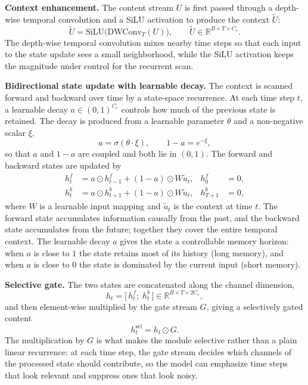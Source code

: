 \noindent\textbf{Context enhancement.}
The content stream $U$ is first passed through a depth-wise temporal
convolution and a SiLU activation to produce the context $\tilde{U}$:
\begin{equation}
  \tilde{U} = \mathrm{SiLU}\big(\mathrm{DWConv}_T(U)\big),
  \qquad \tilde{U} \in \mathbb{R}^{B \times T \times C_r}.
\end{equation}
The depth-wise temporal convolution mixes nearby time steps so that each input
to the state update sees a small neighborhood, while the SiLU activation
keeps the magnitude under control for the recurrent scan.

\noindent\textbf{Bidirectional state update with learnable decay.}
The context is scanned forward and backward over time by a state-space
recurrence. At each time step $t$, a learnable decay $a \in (0,1)^{C_r}$
controls how much of the previous state is retained. The decay is produced
from a learnable parameter $\theta$ and a non-negative scalar $\xi$,
\begin{equation}
  a = \sigma(\theta \cdot \xi), \qquad 1 - a = e^{-\xi},
\end{equation}
so that $a$ and $1-a$ are coupled and both lie in $(0,1)$. The forward and
backward states are updated by
\begin{align}
  h_t^f &= a \odot h_{t-1}^f + (1 - a) \odot W \tilde{u}_t,
          & h_0^f &= 0, \label{eq:tsa_fwd}\\
  h_t^b &= a \odot h_{t+1}^b + (1 - a) \odot W \tilde{u}_t,
          & h_{T+1}^b &= 0, \label{eq:tsa_bwd}
\end{align}
where $W$ is a learnable input mapping and $\tilde{u}_t$ is the context at
time $t$. The forward state accumulates information causally from the past,
and the backward state accumulates from the future; together they cover the
entire temporal context. The learnable decay $a$ gives the state a
controllable memory horizon: when $a$ is close to $1$ the state retains most
of its history (long memory), and when $a$ is close to $0$ the state is
dominated by the current input (short memory).

\noindent\textbf{Selective gate.}
The two states are concatenated along the channel dimension,
\begin{equation}
  h_t = \big[\, h_t^f;\; h_t^b \,\big] \in \mathbb{R}^{B \times T \times 2 C_r},
\end{equation}
and then element-wise multiplied by the gate stream $G$, giving a selectively
gated content
\begin{equation}
  h_t^{\mathrm{sel}} = h_t \odot G.
\end{equation}
The multiplication by $G$ is what makes the module selective rather than a
plain linear recurrence: at each time step, the gate stream decides which
channels of the processed state should contribute, so the model can emphasize
time steps that look relevant and suppress ones that look noisy.

